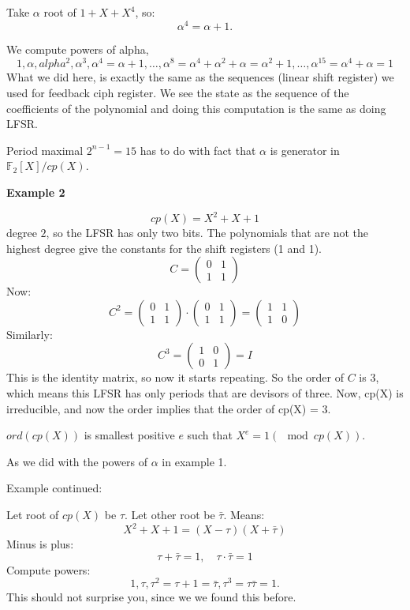 \documentclass[language=english,number=]{homework}
\begin{document}
Take $\alpha$ root of $1 + X + X^4$, so:
\[
\alpha^4 = \alpha + 1.
\]

We compute powers of alpha,
\[
1, \alpha, alpha^2, \alpha^3, \alpha^4 = \alpha + 1, \dots, \alpha^8 = \alpha^4 + \alpha^2 + \alpha = \alpha^2 + 1, \dots, \alpha^{15} = \alpha^4 + \alpha = 1
\]
What we did here, is exactly the same as the sequences (linear shift register) we used for feedback ciph register.
We see the state as the sequence of the coefficients of the polynomial and doing this computation is the same as doing LFSR.

Period maximal $2^{n-1} = 15$ has to do with fact that $\alpha$ is generator in $\mathbb{F}_2[X] / cp(X)$.

\textbf{Example 2}

\[
cp(X) = X^2 + X + 1
\]
degree $2$, so the LFSR has only two bits.
The polynomials that are not the highest degree give the constants for the shift registers (1 and 1).
\[
C = \begin{pmatrix}
0 & 1 \\
1 & 1
\end{pmatrix}
\]
Now:
\[
C^2 = \begin{pmatrix}
0 & 1 \\
1 & 1
\end{pmatrix} \cdot \begin{pmatrix}
0 & 1 \\
1 & 1
\end{pmatrix} = \begin{pmatrix}
1 & 1 \\
1 & 0
\end{pmatrix}
\]
Similarly:
\[
C^3 = \begin{pmatrix}
1 & 0 \\
0 & 1
\end{pmatrix} = I
\]
This is the identity matrix, so now it starts repeating.
So the order of $C$ is 3, which means this LFSR has only periods that are devisors of three.
Now, cp(X) is irreducible, and now the order implies that the order of cp(X) = 3.

\begin{definition}
$ord(cp(X))$ is smallest positive $e$ such that $X^e = 1 (\mod cp(X))$.
\end{definition}
As we did with the powers of $\alpha$ in example 1.

Example continued:

Let root of $cp(X)$ be $\tau$.
Let other root be $\bar{\tau}$.
Means:
\[
X^2 + X + 1 = (X - \tau)(X + \bar{\tau})
\]
Minus is plus:
\[
\tau + \bar{\tau} = 1, \quad \tau \cdot \bar{\tau} = 1
\]
Compute powers:
\[
1, \tau, \tau^2 = \tau + 1 = \bar{\tau}, \tau^3 = \tau \bar{\tau} = 1.
\]
This should not surprise you, since we we found this before.
\end{document}
